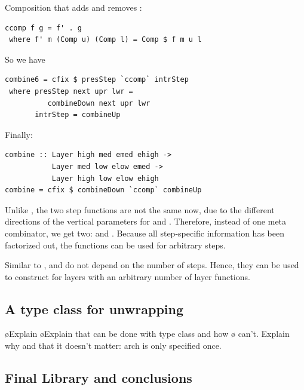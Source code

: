 \documentclass[preprint,natbib]{sigplanconf}
\begin{document}
Composition that adds and removes :
\begin{small}
\begin{verbatim}
ccomp f g = f' . g
 where f' m (Comp u) (Comp l) = Comp $ f m u l
\end{verbatim}%
\end{small}

So we have

\begin{small}%
\begin{verbatim}
combine6 = cfix $ presStep `ccomp` intrStep
 where presStep next upr lwr =  
          combineDown next upr lwr  
       intrStep = combineUp
\end{verbatim}%
\end{small}

Finally:

\begin{small}%
\begin{verbatim}
combine :: Layer high med emed ehigh ->
           Layer med low elow emed -> 
           Layer high low elow ehigh
combine = cfix $ combineDown `ccomp` combineUp
\end{verbatim}%
\end{small}


Unlike , the two step functions are not the same now, due to the different directions of the vertical parameters for  and . Therefore, instead of one meta combinator, we get two:  and . Because all step-specific information has been factorized out, the functions can be used for arbitrary steps.



Similar to ,  and  do not depend on the number of steps. Hence, they can be used to construct  for layers with an arbitrary number of layer functions.
%																
\subsection{A type class for unwrapping}

\bl
\o Explain 
\o Explain that  can be done with type class and how
\o {} can't. Explain why and that it doesn't matter: arch is only specified once.
\el

%																
\subsection{Final Library and conclusions} \label{sect:libAndConclusions}
\end{document}
